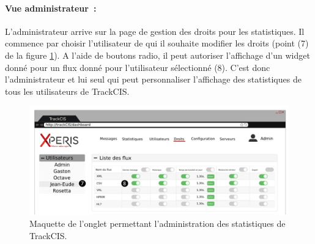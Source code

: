 			\paragraph{Vue administrateur~:}
			L'administrateur arrive sur la page de gestion des droits pour les
			statistiques. Il commence par choisir l'utilisateur de qui il souhaite
			modifier les droits (point (7) de la figure \ref{maquette_admin}). A l'aide
			de boutons radio, il peut autoriser l'affichage d'un widget donné pour un
			flux donné pour l'utilisateur sélectionné (8). C'est donc l'administrateur
			et lui seul qui peut personnaliser l'affichage des statistiques de tous les
			utilisateurs de TrackCIS.
			\begin{figure}[H]
				\centering
				\includegraphics[width=16cm]{../img/part2/maquette_admin_1.png}
				\caption{\label{maquette_admin} Maquette de l'onglet permettant
				l'administration des statistiques de TrackCIS.}
			\end{figure}
			